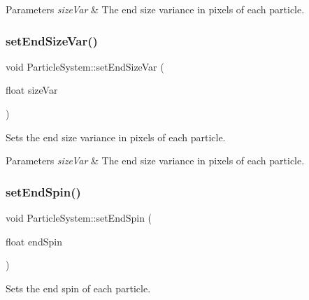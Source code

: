 \begin{DoxyParams}{Parameters}
{\em size\+Var} & The end size variance in pixels of each particle. \\
\hline
\end{DoxyParams}
\mbox{\label{classParticleSystem_a33f6f3a8ef14fd2d6c9f7b0306d3fccc}} 
\subsubsection{\texorpdfstring{set\+End\+Size\+Var()}{setEndSizeVar()}\hspace{0.1cm}{\footnotesize\ttfamily [2/2]}}
{\footnotesize\ttfamily void Particle\+System\+::set\+End\+Size\+Var (\begin{DoxyParamCaption}\item[{float}]{size\+Var }\end{DoxyParamCaption})\hspace{0.3cm}{\ttfamily [inline]}}

Sets the end size variance in pixels of each particle.


\begin{DoxyParams}{Parameters}
{\em size\+Var} & The end size variance in pixels of each particle. \\
\hline
\end{DoxyParams}
\mbox{\label{classParticleSystem_ad79df08329c6f08e0223111eae6b65e0}} 
\subsubsection{\texorpdfstring{set\+End\+Spin()}{setEndSpin()}\hspace{0.1cm}{\footnotesize\ttfamily [1/2]}}
{\footnotesize\ttfamily void Particle\+System\+::set\+End\+Spin (\begin{DoxyParamCaption}\item[{float}]{end\+Spin }\end{DoxyParamCaption})\hspace{0.3cm}{\ttfamily [inline]}}

Sets the end spin of each particle.


